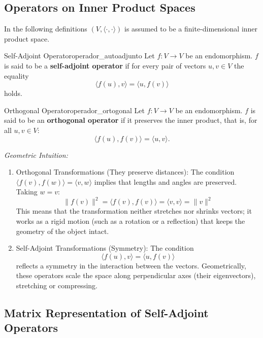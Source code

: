 \documentclass[11pt, a4paper]{article}
\begin{document}
\subsection{Operators on Inner Product Spaces}

In the following definitions $(V, \langle \cdot, \cdot \rangle)$ is assumed to be a finite-dimensional inner product space.

\begin{definicion}{Self-Adjoint Operator}{operador_autoadjunto}
Let $f: V \to V$ be an endomorphism. $f$ is said to be a \textbf{self-adjoint operator} if for every pair of vectors $u, v \in V$ the equality
\[ \langle f(u), v \rangle = \langle u, f(v) \rangle \]
holds.
\end{definicion}

\begin{definicion}{Orthogonal Operator}{operador_ortogonal}
Let $f: V \to V$ be an endomorphism. $f$ is said to be an \textbf{orthogonal operator} if it preserves the inner product, that is, for all $u, v \in V$:
\[ \langle f(u), f(v) \rangle = \langle u, v \rangle. \]
\end{definicion}

\obs \textit{Geometric Intuition:}

\begin{enumerate}
    \item[i)] Orthogonal Transformations (They preserve distances):
    The condition $\langle f(v), f(w) \rangle = \langle v, w \rangle$ implies that lengths and angles are preserved. Taking $w = v$:
    \[ \|f(v)\|^2 = \langle f(v), f(v) \rangle = \langle v, v \rangle = \|v\|^2 \]
    This means that the transformation neither stretches nor shrinks vectors; it works as a rigid motion (such as a rotation or a reflection) that keeps the geometry of the object intact.

    \item[ii)] Self-Adjoint Transformations (Symmetry):
    The condition \[ \langle f(u), v \rangle = \langle u, f(v) \rangle \] reflects a symmetry in the interaction between the vectors.
    Geometrically, these operators scale the space along perpendicular axes (their eigenvectors), stretching or compressing.
\end{enumerate}

\subsection{Matrix Representation of Self-Adjoint Operators}
\end{document}
